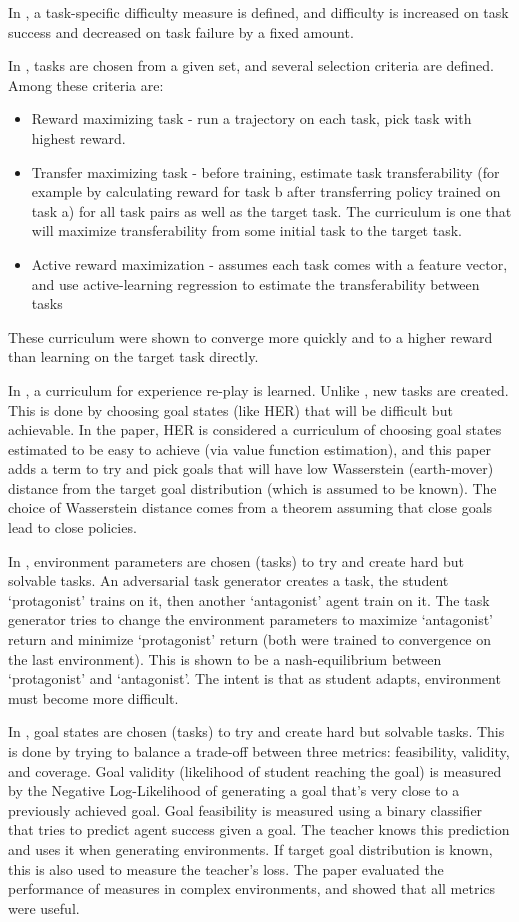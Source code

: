 \documentclass[letterpaper]{article}
\theoremstyle{definition}
\begin{document}
In \cite{Justesen2018}, a task-specific difficulty measure is defined, and difficulty is increased on task success and decreased on task failure by a fixed amount.

In \cite{Jain2017}, tasks are chosen from a given set, and several selection criteria are defined. Among these criteria are:
\begin{itemize}
	\item Reward maximizing task - run a trajectory on each task, pick task with highest reward.
	\item Transfer maximizing task - before training, estimate task transferability (for example by calculating reward for task b after transferring policy trained on task a) for all task pairs as well as the target task. The curriculum is one that will maximize transferability from some initial task to the target task.
	\item Active reward maximization - assumes each task comes with a feature vector, and use active-learning regression to estimate the transferability between tasks
\end{itemize}
These curriculum were shown to converge more quickly and to a higher reward than learning on the target task directly.

In \cite{Reny2019}, a curriculum for experience re-play is learned. Unlike \cite{Jiang2020}, new tasks are created. This is done by choosing goal states (like HER) that will be difficult but achievable. In the paper, HER is considered a curriculum of choosing goal states estimated to be easy to achieve (via value function estimation), and this paper adds a term to try and pick goals that will have low Wasserstein (earth-mover) distance from the target goal distribution (which is assumed to be known). The choice of Wasserstein distance comes from a theorem assuming that close goals lead to close policies.

In \cite{Dennis2020}, environment parameters are chosen (tasks) to try and create hard but solvable tasks. An adversarial task generator creates a task, the student `protagonist' trains on it, then another `antagonist' agent train on it. The task generator tries to change the environment parameters to maximize `antagonist' return and minimize `protagonist' return (both were trained to convergence on the last environment). This is shown to be a nash-equilibrium between `protagonist' and `antagonist'. The intent is that as student adapts, environment must become more difficult.

In \cite{Racaniere2019}, goal states are chosen (tasks) to try and create hard but solvable tasks. 
This is done by trying to balance a trade-off between three metrics: feasibility, validity, and coverage.
Goal validity (likelihood of student reaching the goal) is measured by the Negative Log-Likelihood of generating a goal that's very close to a previously achieved goal.
Goal feasibility is measured using a binary classifier that tries to predict agent success given a goal. The teacher knows this prediction and uses it when generating environments.
If target goal distribution is known, this is also used to measure the teacher's loss.
The paper evaluated the performance of measures in complex environments, and showed that all metrics were useful.
\end{document}
